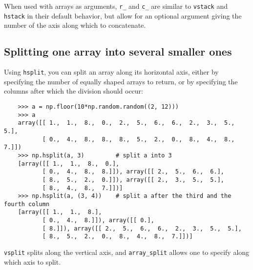 \documentclass[UTF8]{article}
\begin{document}
When used with arrays as arguments, \texttt{r\_} and \texttt{c\_} are similar to \texttt{vstack}
and \texttt{hstack} in their default behavior, but allow for an optional argument giving the number
of the axis along which to concatenate.

\subsection{Splitting one array into several smaller ones}
Using \texttt{hsplit}, you can split an array along its horizontal axis, either by specifying the
number of equally shaped arrays to return, or by specifying the columns after which the division
should occur:
\begin{verbatim}
    >>> a = np.floor(10*np.random.random((2, 12)))
    >>> a
    array([[ 1.,  1.,  8.,  0.,  2.,  5.,  6.,  6.,  2.,  3.,  5.,  5.],
           [ 0.,  4.,  8.,  8.,  8.,  5.,  2.,  0.,  8.,  4.,  8.,  7.]])
    >>> np.hsplit(a, 3)         # split a into 3
    [array([[ 1.,  1.,  8.,  0.],
           [ 0.,  4.,  8.,  8.]]), array([[ 2.,  5.,  6.,  6.],
           [ 8.,  5.,  2.,  0.]]), array([[ 2.,  3.,  5.,  5.],
           [ 8.,  4.,  8.,  7.]])]
    >>> np.hsplit(a, (3, 4))    # split a after the third and the fourth column
    [array([[ 1.,  1.,  8.],
           [ 0.,  4.,  8.]]), array([[ 0.],
           [ 8.]]), array([[ 2.,  5.,  6.,  6.,  2.,  3.,  5.,  5.],
           [ 8.,  5.,  2.,  0.,  8.,  4.,  8.,  7.]])]
\end{verbatim}

\texttt{vsplit} splits along the vertical axis, and \texttt{array\_split} allows one to specify
along which axis to split.
\end{document}
